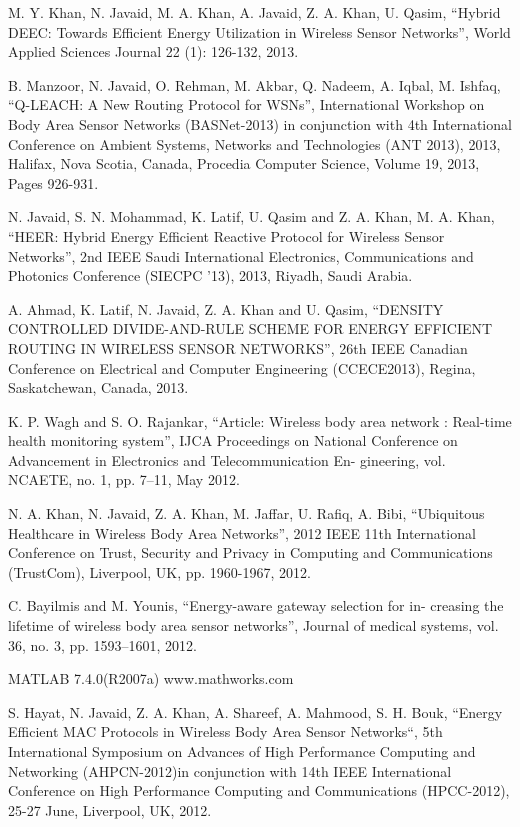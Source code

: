\documentclass[journal]{IEEEtran}
\begin{document}
\begin{thebibliography}{1}
M. Y. Khan, N. Javaid, M. A. Khan, A. Javaid, Z. A. Khan, U. Qasim, ``Hybrid DEEC: Towards Efficient Energy Utilization in Wireless Sensor Networks'', World Applied Sciences Journal 22 (1): 126-132, 2013.

B. Manzoor, N. Javaid, O. Rehman, M. Akbar, Q. Nadeem, A. Iqbal, M. Ishfaq, ``Q-LEACH: A New Routing Protocol for WSNs'', International Workshop on Body Area Sensor Networks (BASNet-2013) in conjunction with 4th International Conference on Ambient Systems, Networks and Technologies (ANT 2013), 2013, Halifax, Nova Scotia, Canada, Procedia Computer Science, Volume 19, 2013, Pages 926-931.

N. Javaid, S. N. Mohammad, K. Latif, U. Qasim and Z. A. Khan, M. A. Khan, ``HEER: Hybrid Energy Efficient Reactive Protocol for Wireless Sensor Networks'', 2nd IEEE Saudi International Electronics, Communications and Photonics Conference (SIECPC ’13), 2013, Riyadh, Saudi Arabia.

A. Ahmad, K. Latif, N. Javaid, Z. A. Khan and U. Qasim,	``DENSITY CONTROLLED DIVIDE-AND-RULE SCHEME FOR ENERGY EFFICIENT ROUTING IN WIRELESS SENSOR NETWORKS'', 26th IEEE Canadian Conference on Electrical and Computer Engineering (CCECE2013), Regina, Saskatchewan, Canada, 2013.

K. P. Wagh and S. O. Rajankar, ``Article: Wireless body area network
: Real-time health monitoring system'', IJCA Proceedings on National
Conference on Advancement in Electronics and Telecommunication En-
gineering, vol. NCAETE, no. 1, pp. 7–11, May 2012.

N. A. Khan, N. Javaid, Z. A. Khan, M. Jaffar, U. Rafiq, A. Bibi, ``Ubiquitous Healthcare in Wireless Body Area Networks'', 2012 IEEE 11th International Conference on Trust, Security and Privacy in Computing and Communications (TrustCom), Liverpool, UK, pp. 1960-1967, 2012.

C. Bayilmis and M. Younis, ``Energy-aware gateway selection for in-
creasing the lifetime of wireless body area sensor networks'', Journal of
medical systems, vol. 36, no. 3, pp. 1593–1601, 2012.

MATLAB 7.4.0(R2007a)  www.mathworks.com

S. Hayat, N. Javaid, Z. A. Khan, A. Shareef, A. Mahmood, S. H. Bouk, ``Energy Efficient MAC Protocols in Wireless Body Area Sensor Networks``, 5th International Symposium on Advances of High Performance Computing and Networking (AHPCN-2012)in conjunction with 14th IEEE International Conference on High Performance Computing and Communications (HPCC-2012), 25-27 June, Liverpool, UK, 2012.


\end{thebibliography}
\end{document}
